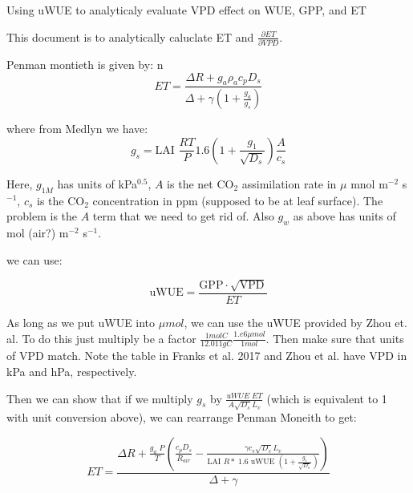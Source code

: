 
\usepackage{graphics, graphicx}
\graphicspath{ {./} } %


\begin{center}
\large{Using uWUE to analyticaly evaluate VPD effect on WUE, GPP, and ET}\end{center}

\bigskip

This document is to analytically caluclate ET and $\frac{\partial ET} {\partial VPD}$.

Penman montieth is given by:
n
\begin{equation}
  ET = \frac{\Delta R + g_a \rho_a c_p D_{s}}{\Delta + \gamma(1 + \frac{g_a}{g_s})}
\end{equation}

where from Medlyn we have:
\begin{equation}
  g_s = \text{LAI } \frac{R T}{P} 1.6 \left(1 + \frac{g_1}{\sqrt{D_{s}}}\right) \frac{A}{c_s}
\end{equation}

Here, $g_{1M}$ has units of kPa$^{0.5}$, $A$ is the net CO$_2$ assimilation rate in $\mu$ mnol m$^{-2}$ s$^{-1}$, $c_s$ is the CO$_2$ concentration in ppm (supposed to be at leaf surface). The problem is the $A$ term that we need to get rid of. Also $g_w$ as above has units of mol (air?) m$^{-2}$ s$^{-1}$. 

we can use:

\begin{equation}
  \text{uWUE} = \frac{\text{GPP} \cdot \sqrt{\text{VPD}}}{ET}
\end{equation}

As long as we put uWUE into $\mu mol$, we can use the uWUE provided by Zhou et. al. To do this just multiply be a factor $ \frac{1 mol C}{12.011 g C} \frac{1.e6 \mu mol}{1 mol}$. Then make sure that units of VPD match. Note the table in Franks et al. 2017 and Zhou et al. have VPD in kPa and hPa, respectively.

Then we can show that if we multiply $g_s$ by $\frac{ uWUE \; ET}{A \sqrt{D_s} L_v}$ (which is equivalent to 1 with unit conversion above), we can rearrange Penman Moneith to get:

\begin{equation}
  ET = \frac{\Delta R + \frac{g_a\; P}{T} \left( \frac{ c_p D_{s}}{R_{air}} - \frac{\gamma c_s \sqrt{D_s} L_v }{\text{LAI } R* \; 1.6 \text{ uWUE } (1 + \frac{g_1}{\sqrt{D_s}})} \right) }{ \Delta + \gamma}
\end{equation}

